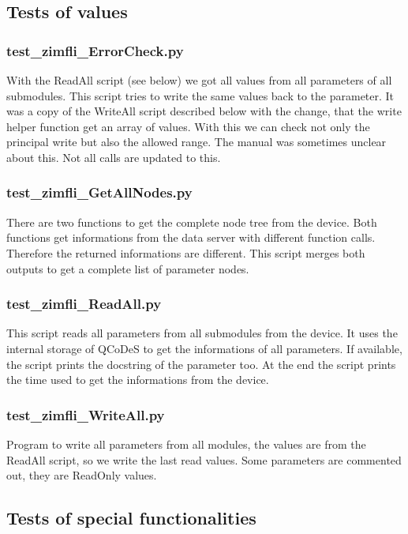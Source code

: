 \documentclass[11pt]{article} %
\begin{document}
\subsection{Tests of values}

\subsubsection{test\_zimfli\_ErrorCheck.py}
With the ReadAll script (see below) we got all values from all parameters of all submodules. This script tries to write the same values back to the parameter. It was a copy of the WriteAll script described below with the change, that the write helper function get an array of values. With this we can check not only the principal write but also the allowed range. The manual was sometimes unclear about this. Not all calls are updated to this.

\subsubsection{test\_zimfli\_GetAllNodes.py}
There are two functions to get the complete node tree from the device. Both functions get informations from the data server with different function calls. Therefore the returned informations are different. This script merges both outputs to get a complete list of parameter nodes.

\subsubsection{test\_zimfli\_ReadAll.py}
This script reads all parameters from all submodules from the device. It uses the internal storage of QCoDeS to get the informations of all parameters. If available, the script prints the docstring of the parameter too. At the end the script prints the time used to get the informations from the device.

\subsubsection{test\_zimfli\_WriteAll.py}
Program to write all parameters from all modules, the values are from the ReadAll script, so we write the last read values. Some parameters are commented out, they are ReadOnly values.


\subsection{Tests of special functionalities}
\end{document}
